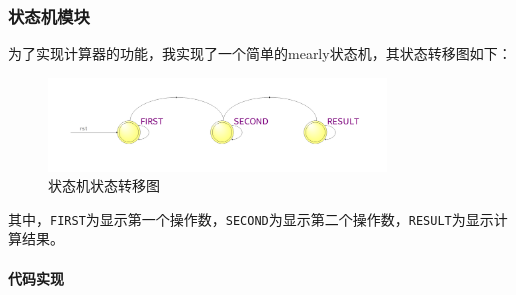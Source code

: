 \documentclass[UTF8]{ctexart}
\newcommand{\subsubsubsection}[1]{\paragraph{#1}\mbox{}\\}
\begin{document}
\subsubsection{状态机模块}
为了实现计算器的功能，我实现了一个简单的mearly状态机，其状态转移图如下：
\begin{figure}[H]
    \centering
    \includegraphics[width=0.8\textwidth]{task1_3_3.png}
    \caption{状态机状态转移图}
\end{figure}
其中，\texttt{FIRST}为显示第一个操作数，\texttt{SECOND}为显示第二个操作数，\texttt{RESULT}为显示计算结果。
\subsubsubsection{代码实现}
\end{document}
